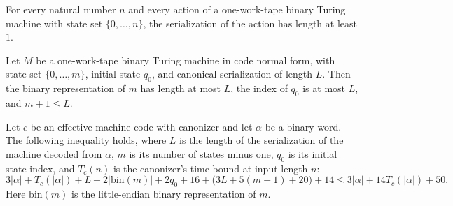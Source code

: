 \begin{lemma}
\label{Complexity.tmsat_action_nonempty}
\leanok
{}
For every natural number $n$ and every action of a one-work-tape binary Turing machine
with state set $\{0,\dots,n\}$, the serialization of the action has length at least
$1$.
\end{lemma}

\begin{lemma}
\label{Complexity.tmsat_serialization_parameters}
\leanok
{}
Let $M$ be a one-work-tape binary Turing machine in code normal form, with state set
$\{0,\ldots,m\}$, initial state $q_0$, and canonical serialization of length $L$. Then
the binary representation of $m$ has length at most $L$, the index of $q_0$ is at most
$L$, and $m+1\le L$.
\end{lemma}

\begin{lemma}
\label{Complexity.tmsat_concrete_coefficient}
\leanok
{}
Let $c$ be an effective machine code with canonizer and let $\alpha$ be a binary word.
The following inequality holds, where $L$ is the length of the serialization of the
machine decoded from $\alpha$, $m$ is its number of states minus one, $q_0$ is its
initial state index, and $T_c(n)$ is the canonizer's time bound at input length $n$:
\[
3|\alpha|+T_c(|\alpha|)+L+2|\mathrm{bin}(m)|+2q_0+16+\bigl(3L+5(m+1)+20\bigr)+14\le
3|\alpha|+14T_c(|\alpha|)+50.
\]
Here $\mathrm{bin}(m)$ is the little-endian binary representation of $m$.
\end{lemma}

